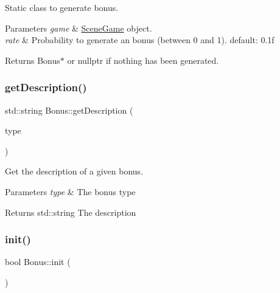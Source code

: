 Static class to generate bonus. 


\begin{DoxyParams}{Parameters}
{\em game} & \hyperlink{class_scene_game}{Scene\+Game} object. \\
\hline
{\em rate} & Probability to generate an bonus (between 0 and 1). default\+: 0.\+1f \\
\hline
\end{DoxyParams}
\begin{DoxyReturn}{Returns}
Bonus$\ast$ or nullptr if nothing has been generated. 
\end{DoxyReturn}
\mbox{\label{class_bonus_a1d044965859366e57fbe7fcb1eb8a458}} 
\subsubsection{\texorpdfstring{get\+Description()}{getDescription()}}
{\footnotesize\ttfamily std\+::string Bonus\+::get\+Description (\begin{DoxyParamCaption}\item[{Bonus\+Type\+::\+Enum}]{type }\end{DoxyParamCaption})\hspace{0.3cm}{\ttfamily [static]}}



Get the description of a given bonus. 


\begin{DoxyParams}{Parameters}
{\em type} & The bonus type \\
\hline
\end{DoxyParams}
\begin{DoxyReturn}{Returns}
std\+::string The description 
\end{DoxyReturn}
\mbox{\label{class_bonus_a976414b70e76b18dadeae3f316a22547}} 
\subsubsection{\texorpdfstring{init()}{init()}}
{\footnotesize\ttfamily bool Bonus\+::init (\begin{DoxyParamCaption}{ }\end{DoxyParamCaption})\hspace{0.3cm}{\ttfamily [virtual]}}



